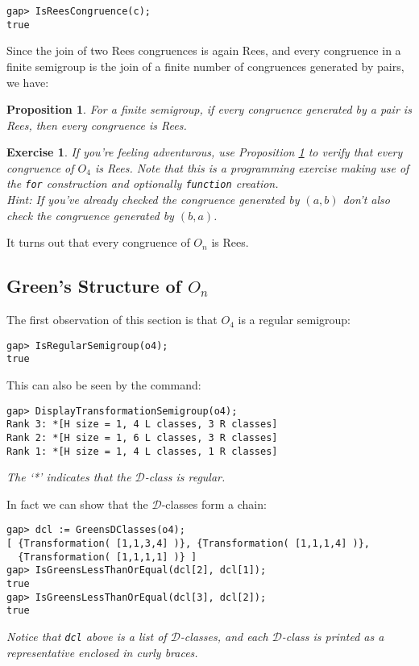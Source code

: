 \documentclass{ws-p8-50x6-00}
\theoremstyle{plain} \newtheorem{Thm}{Theorem}
\theoremstyle{plain} \newtheorem{Cor}{Corollary}
\theoremstyle{plain} \newtheorem{Lemma}{Lemma}
\theoremstyle{plain} \newtheorem{Prop}{Proposition}
\theoremstyle{plain} \newtheorem{Ex}{Exercise}
\def\d{${\mathcal{D}}$}
\begin{document}
\begin{verbatim}
gap> IsReesCongruence(c);
true
\end{verbatim}

Since the join of two Rees congruences is again Rees, 
and every congruence in a finite semigroup is the join of a
finite number of congruences generated by pairs,  we have:
\begin{Prop}\label{reespair}
For a finite semigroup, if every congruence generated by a pair 
is Rees, then every congruence is Rees.
\end{Prop}

\begin{Ex} If you're feeling adventurous, use Proposition \ref{reespair}
to verify that every congruence of $O_4$ is Rees. 
Note that this is a programming exercise making use of 
the {\tt for} construction and optionally {\tt function} creation.\\
{\rm Hint: If you've already checked the congruence generated by $(a,b)$ don't 
also check the congruence generated by $(b,a)$.}
\end{Ex}
It turns out that every congruence of $O_n$ is Rees\cite{tglsol99}. 

\subsection{Green's Structure of $O_n$}
The first observation of this section is that $O_4$ is a regular semigroup:
\begin{verbatim}
gap> IsRegularSemigroup(o4);
true
\end{verbatim}
This can also be seen by the command:
\begin{verbatim}
gap> DisplayTransformationSemigroup(o4);
Rank 3: *[H size = 1, 4 L classes, 3 R classes]
Rank 2: *[H size = 1, 6 L classes, 3 R classes]
Rank 1: *[H size = 1, 4 L classes, 1 R classes]
\end{verbatim}
{\em The `*' indicates that the {\d}-class is regular.}

In fact we can show that the {\d}-classes form a chain:
\begin{verbatim}
gap> dcl := GreensDClasses(o4);
[ {Transformation( [1,1,3,4] )}, {Transformation( [1,1,1,4] )}, 
  {Transformation( [1,1,1,1] )} ]
gap> IsGreensLessThanOrEqual(dcl[2], dcl[1]);
true
gap> IsGreensLessThanOrEqual(dcl[3], dcl[2]);
true
\end{verbatim}
{\em Notice that {\tt dcl} above is a list of \d-classes, and each
\d-class is printed as a representative enclosed in curly braces.}
\end{document}
